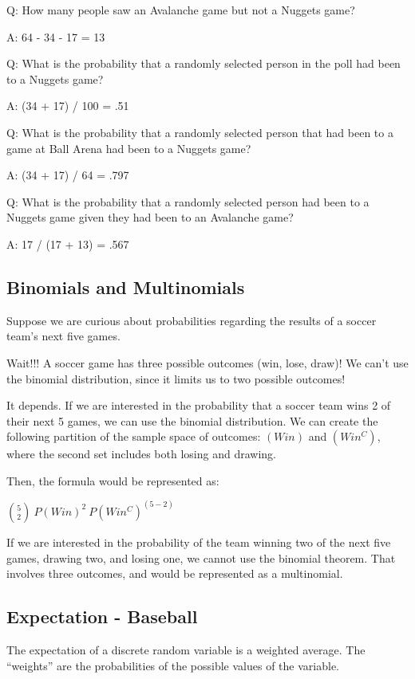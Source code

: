 \documentclass[
  11pt,
]{book}
\theoremstyle{definition}
\theoremstyle{definition}
\theoremstyle{definition}
\theoremstyle{definition}
\theoremstyle{remark}
\begin{document}
Q: How many people saw an Avalanche game but not a Nuggets game?

A: 64 - 34 - 17 = 13

Q: What is the probability that a randomly selected person in the poll had been to a Nuggets game?

A: (34 + 17) / 100 = .51

Q: What is the probability that a randomly selected person that had been to a game at Ball Arena had been to a Nuggets game?

A: (34 + 17) / 64 = .797

Q: What is the probability that a randomly selected person had been to a Nuggets game given they had been to an Avalanche game?

A: 17 / (17 + 13) = .567

\hypertarget{binomials-and-multinomials}{%
\subsection{Binomials and Multinomials}\label{binomials-and-multinomials}}

Suppose we are curious about probabilities regarding the results of a soccer team's next five games.

Wait!!! A soccer game has three possible outcomes (win, lose, draw)! We can't use the binomial distribution, since it limits us to two possible outcomes!

It depends. If we are interested in the probability that a soccer team wins 2 of their next 5 games, we can use the binomial distribution. We can create the following partition of the sample space of outcomes: \((Win)\) and \((Win^C)\), where the second set includes both losing and drawing.

Then, the formula would be represented as:

\(\binom{5}{2}\ P(Win)^2\  P(Win^C)^{(5-2)}\)

If we are interested in the probability of the team winning two of the next five games, drawing two, and losing one, we cannot use the binomial theorem. That involves three outcomes, and would be represented as a multinomial.

\hypertarget{expectation---baseball}{%
\subsection{Expectation - Baseball}\label{expectation---baseball}}

The expectation of a discrete random variable is a weighted average. The ``weights'' are the probabilities of the possible values of the variable.
\end{document}

